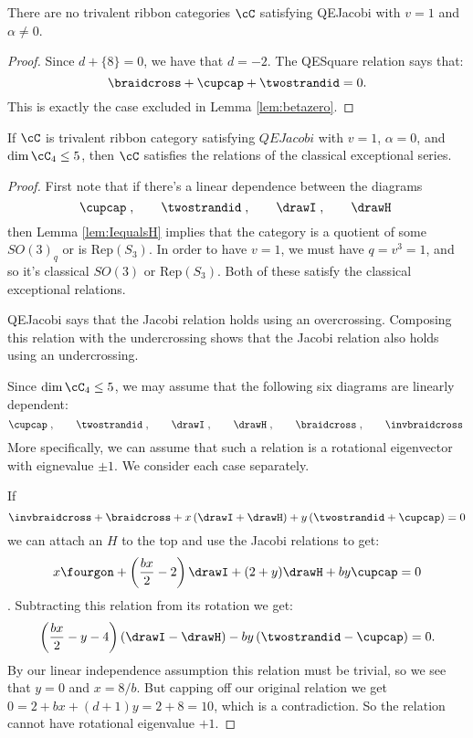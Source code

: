 \documentclass[12pt]{amsart}
\begin{document}
\begin{lemma}
There are no trivalent ribbon categories $\cC$ satisfying QEJacobi with $v=1$ and $\alpha \neq 0$.
\end{lemma}
\begin{proof}
Since $d+\{8\}=0$, we have that $d=-2$.  The QESquare relation says that:
$$\braidcross + \cupcap + \twostrandid = 0.$$
This is exactly the case excluded in Lemma \ref{lem:betazero}.
\end{proof}

\begin{theorem}
If $\cC$ is trivalent ribbon category satisfying $QEJacobi$ with $v=1$, $\alpha =0$, and $\dim \cC_4 \leq 5$, then $\cC$ satisfies the relations of the classical exceptional series.
\end{theorem}
\begin{proof}
First note that if there's a linear dependence between the diagrams
 \[
  \cupcap\;,\qquad\twostrandid\;,
    \qquad\drawI\;,\qquad\drawH\; \]
then Lemma \ref{lem:IequalsH} implies that the category is a quotient of some $SO(3)_q$ or is $\mathrm{Rep}(S_3)$.  In order to have $v=1$, we must have $q = v^3 = 1$, and so it's classical $SO(3)$ or $\mathrm{Rep}(S_3)$.  Both of these satisfy the classical exceptional relations.

QEJacobi says that the Jacobi relation holds using an overcrossing.  Composing this relation with the undercrossing shows that the Jacobi relation also holds using an undercrossing.

Since $\dim \cC_4 \leq 5$, we may assume that the following six diagrams are linearly dependent:
 \[
  \cupcap\;,\qquad\twostrandid\;,
    \qquad\drawI\;,\qquad\drawH\;,\qquad\braidcross\;,\qquad \invbraidcross\;
   \]
More specifically, we can assume that such a relation is a rotational eigenvector with eignevalue $\pm 1$.  We consider each case separately.

If
\[\invbraidcross + \braidcross + x\left(\drawI + \drawH\right) + y \left(\twostrandid+\cupcap\right)=0\]
we can attach an $H$ to the top and use the Jacobi relations to get:
\[ x \fourgon +\left(\frac{bx}{2} -2\right) \drawI + (2+y)\drawH + b y \cupcap = 0\].
Subtracting this relation from its rotation we get:
\[\left(\frac{bx}{2} -y -4\right) \left(\drawI-\drawH\right) -b y \left(\twostrandid - \cupcap\right) = 0.\]
By our linear independence assumption this relation must be trivial, so we see that $y=0$ and $x = 8/b$.  But capping off our original relation we get $0 = 2+bx+(d+1)y = 2+8 = 10$, which is a contradiction.  So the relation cannot have rotational eigenvalue $+1$.


\end{proof}
\end{document}
